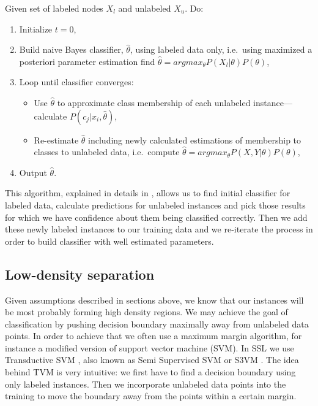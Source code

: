 \documentclass[12pt, a4paper, pdflatex]{report}
\begin{document}
Given set of labeled nodes $X_l$ and unlabeled $X_u$. Do:\\
\begin{enumerate}
\item Initialize $t  = 0 $,
\item Build naive Bayes classifier, $ \hat{\theta}$, using labeled data only, i.e.\ using maximized a posteriori parameter estimation find $ \hat{\theta} = argmax_{\theta} P(X_{l} | \theta)P(\theta) $,
\item Loop until classifier converges:
	\begin{itemize}
	\item Use $\hat{\theta}$ to approximate class membership of each unlabeled instance--- calculate $ P(c_j|x_i, \hat{\theta})$,
	\item Re-estimate $\hat{\theta}$ including newly calculated estimations of membership to classes to unlabeled data, i.e.\ compute $ \hat{\theta} = argmax_{\theta} P(X, Y | \theta)P(\theta) $,
	\end{itemize}
\item Output $\hat{\theta}$.

\end{enumerate}

This algorithm, explained in details in \cite{chapelle06}, allows us to find initial classifier for labeled data, calculate predictions for unlabeled instances and pick those results for which we have confidence about them being classified correctly. Then we add these newly labeled instances to our training data and we re-iterate the process in order to build classifier with well estimated parameters.

\subsection{Low-density separation}

Given assumptions described in sections above, we know that our instances will be most probably forming high density regions. We may achieve the goal of classification by pushing decision boundary maximally away from unlabeled data points.
In order to achieve that we often use a maximum margin algorithm, for instance a modified version of support vector machine (SVM)\cite{chapelle06,Zhu06semi}. In SSL we use Transductive SVM \cite{chapelle06}, also known as Semi Supervised SVM or S3VM \cite{Zhu06semi}.
The idea behind TVM is very intuitive: we first have to find a decision boundary using only labeled instances. Then we incorporate unlabeled data points into the training to move the boundary away from the points within a certain margin.\\[1cm]
\end{document}
